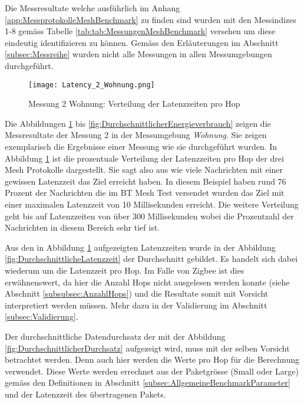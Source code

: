 Die Messresultate welche ausführlich im Anhang \ref{app:MessprotokolleMeshBenchmark} zu finden sind wurden mit den Messindizes 1-8 gemäss Tabelle \ref{tab:tab:MessungenMeshBenchmark} versehen um diese eindeutig identifizieren zu können.
Gemäss den Erläuterungen im Abschnitt \ref{subsec:Messreihe} wurden nicht alle Messungen in allen Messumgebungen durchgeführt.

\begin{figure}[h]
	\centering
	\texttt{[image: Latency\_2\_Wohnung.png]}
	\caption{Messung 2 Wohnung: Verteilung der Latenzzeiten pro Hop}
	\label{fig:VerteilungderLatenzzeiten}
\end{figure}

Die Abbildungen \ref{fig:VerteilungderLatenzzeiten} bis \ref{fig:DurchschnittlicherEnergieverbrauch} zeigen die Messresultate der Messung 2 in der Messumgebung \textit{Wohnung}. Sie zeigen exemplarisch die Ergebnisse einer Messung wie sie durchgeführt wurden.
In Abbildung \ref{fig:VerteilungderLatenzzeiten} ist die prozentuale Verteilung der Latenzzeiten pro Hop der drei Mesh Protokolle dargestellt.
Sie sagt also aus wie viele Nachrichten mit einer gewissen Latenzzeit das Ziel erreicht haben.
In diesem Beispiel haben rund 76 Prozent der Nachrichten die im BT Mesh Test versendet wurden das Ziel mit einer maximalen Latenzzeit von 10 Millisekunden erreicht.
Die weitere Verteilung geht bis auf Latenzzeiten von über 300 Millisekunden wobei die Prozentzahl der Nachrichten in diesem Bereich sehr tief ist.

Aus den in Abbildung \ref{fig:VerteilungderLatenzzeiten} aufgezeigten Latenzzeiten wurde in der Abbildung \ref{fig:DurchschnittlicheLatenzzeit} der Durchschnitt gebildet. Es handelt sich dabei wiederum um die Latenzzeit pro Hop. Im Falle von Zigbee ist dies erwähnenswert, da hier die Anzahl Hops nicht ausgelesen werden konnte (siehe Abschnitt \ref{subsubsec:AnzahlHops}) und die Resultate somit mit Vorsicht interpretiert werden müssen. Mehr dazu in der Validierung im Abschnitt \ref{subsec:Validierung}.

Der durchschnittliche Datendurchsatz der mit der Abbildung \ref{fig:DurchschnittlicherDurchsatz} aufgezeigt wird, muss mit der selben Vorsicht betrachtet werden. Denn auch hier werden die Werte pro Hop für die Berechnung verwendet.
Diese Werte werden errechnet aus der Paketgrösse (Small oder Large) gemäss den Definitionen in Abschnitt \ref{subsec:AllgemeineBenchmarkParameter} und der Latenzzeit des übertragenen Pakets.



